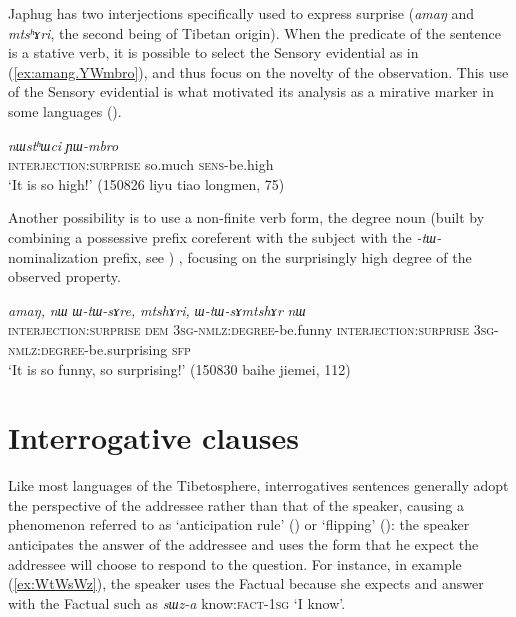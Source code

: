 \documentclass[oldfontcommands,oneside,a4paper,11pt]{article}
\newcommand{\ipa}[1]{{\phon\textit{#1}}} %
\newcommand{\refb}[1]{(\ref{#1})}
\begin{document}
Japhug has two interjections specifically used to express surprise (\ipa{amaŋ} and \ipa{mtsʰɤri}, the second being of Tibetan origin). When the predicate of the sentence is a stative verb, it is possible to select the Sensory evidential as in \refb{ex:amang.YWmbro}, and thus focus on the novelty of the observation. This use of the Sensory evidential is what motivated its analysis as a mirative marker in some languages (\citealt{hill12mirativity}).

\begin{exe}
\ex \label{ex:amang.YWmbro}
 \gll \ipa{amaŋ,}	\ipa{nɯstʰɯci}	\ipa{ɲɯ-mbro} \\
 \textsc{interjection:surprise} so.much \textsc{sens}-be.high \\
 \glt `It is so high!' (150826 liyu tiao longmen, 75)
\end{exe}

Another possibility is to use a non-finite verb form, the degree noun (built by combining a possessive prefix coreferent with the subject with the \ipa{-tɯ-} nominalization prefix, see \citealt[10-11]{jacques16comparative}) , focusing on the surprisingly high degree of the observed property.

\begin{exe}
\ex \label{ex:amang.WtWsAre}
 \gll 
\ipa{amaŋ,}	\ipa{nɯ}	\ipa{ɯ-tɯ-sɤre,}	\ipa{mtshɤri,}	\ipa{ɯ-tɯ-sɤmtshɤr}	\ipa{nɯ}	\\
 \textsc{interjection:surprise} \textsc{dem} \textsc{3sg-nmlz:degree}-be.funny  \textsc{interjection:surprise} \textsc{3sg-nmlz:degree}-be.surprising \textsc{sfp} \\
 \glt `It is so funny, so surprising!' (150830 baihe jiemei, 112)
\end{exe}
\section{Interrogative clauses}
Like most languages of the Tibetosphere, interrogatives sentences generally adopt the perspective of the addressee rather than that of the speaker, causing a phenomenon referred to as `anticipation rule' (\citealt[244]{tournadre14evidentiality}) or `flipping' (\citealt{sanroque17interrogativity}):   the speaker anticipates the answer of the addressee and uses the form that he expect the addressee will choose to respond to the question. For instance, in example \refb{ex:WtWsWz}, the speaker uses the Factual because she expects and answer with the Factual such as \ipa{sɯz-a} know:\textsc{fact}-\textsc{1sg} `I know'.
\end{document}
